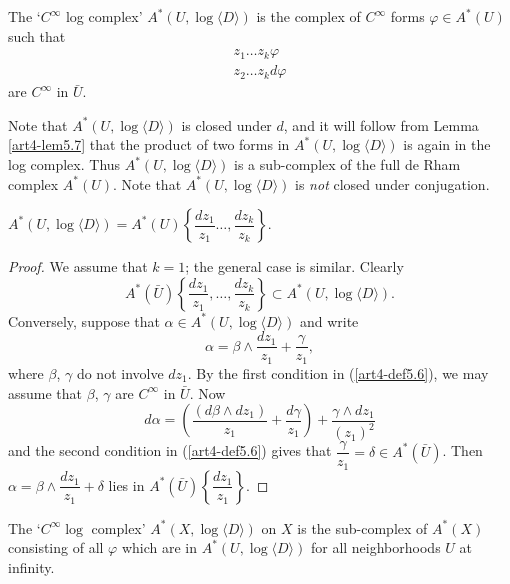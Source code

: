 \setcounter{equation}{5}
\begin{definition}\label{art4-def5.6}
The `$C^\infty$ log complex' $A^\ast (U, \log \langle D\rangle)$ is the complex of $C^\infty$ forms $\varphi \in A^\ast (U)$ such that
\begin{gather*}
z_1 \ldots z_k \varphi \\
z_2 \ldots z_k d \varphi 
\end{gather*}
are $C^\infty$ in $\bar{U}$.
\end{definition}

Note that $A^\ast (U, \log \langle D \rangle)$ is closed under $d$, and it will follow from Lemma \eqref{art4-lem5.7} that the product of two forms in $A^\ast (U, \log \langle D \rangle )$ is again in the log complex. Thus $A^\ast (U, \log \langle D \rangle)$ is a sub-complex of the full de Rham complex $A^\ast (U)$. Note that $A^\ast (U, \log \langle D \rangle)$ is \textit{not} closed under conjugation.

\begin{lemma}\label{art4-lem5.7}
$A^\ast (U, \log \langle D \rangle) = A^\ast (U) \left\{\dfrac{dz_1}{z_1} \ldots , \dfrac{dz_k}{z_k} \right\}$.
\end{lemma}

\begin{proof}
We assume that $k =1$; the general case is similar. Clearly
$$
A^\ast (\bar{U}) \left\{\frac{dz_1}{z_1}, \ldots, \frac{dz_k}{z_k} \right\} \subset A^\ast (U, \log \langle D \rangle).
$$
Conversely, suppose that $\alpha \in A^\ast (U, \log\langle D \rangle)$  and write 
$$
\alpha = \beta \wedge \frac{dz_1}{z_1} + \frac{\gamma}{z_1},
$$ 
where $\beta$, $\gamma$ do not involve $dz_1$. By the first condition in (\ref{art4-def5.6}), we may assume that $\beta$, $\gamma$ are $C^\infty$ in $\bar{U}$. Now
$$
d\alpha = \left(\frac{(d \beta \wedge dz_1)}{z_1} + \frac{d\gamma}{z_1} \right) + \frac{\gamma \wedge dz_1}{(z_1)^2}
$$\pageoriginale
and the second condition in (\ref{art4-def5.6}) gives that $\dfrac{\gamma}{z_1} = \delta \in A^\ast (\bar{U})$. Then $\alpha = \beta \wedge \dfrac{dz_1}{z_1} + \delta$ lies in $A^\ast (\bar{U}) \left\{\dfrac{dz_1}{z_1} \right\}$.
\end{proof}

\begin{definition}\label{art4-def5.8}
The `$C^\infty \log$ complex' $A^\ast (X, \log \langle D \rangle)$ on $X$ is the sub-complex of $A^\ast (X)$ consisting of all $\varphi$ which are in $A^\ast (U, \log \langle D \rangle)$ for all neighborhoods $U$ at infinity.
\end{definition}

